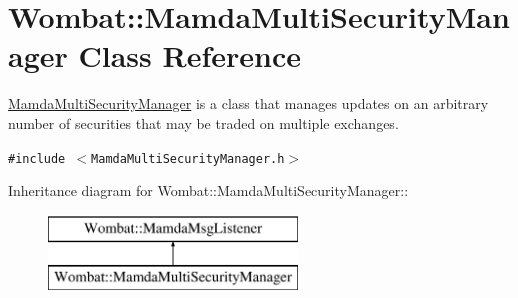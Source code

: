 \hypertarget{classWombat_1_1MamdaMultiSecurityManager}{
\section{Wombat::Mamda\-Multi\-Security\-Manager Class Reference}
\label{classWombat_1_1MamdaMultiSecurityManager}
}
\hyperlink{classWombat_1_1MamdaMultiSecurityManager}{Mamda\-Multi\-Security\-Manager} is a class that manages updates on an arbitrary number of securities that may be traded on multiple exchanges.  


{\tt \#include $<$Mamda\-Multi\-Security\-Manager.h$>$}

Inheritance diagram for Wombat::Mamda\-Multi\-Security\-Manager::\begin{figure}[H]
\begin{center}
\leavevmode
\includegraphics[height=2cm]{classWombat_1_1MamdaMultiSecurityManager}
\end{center}
\end{figure}
